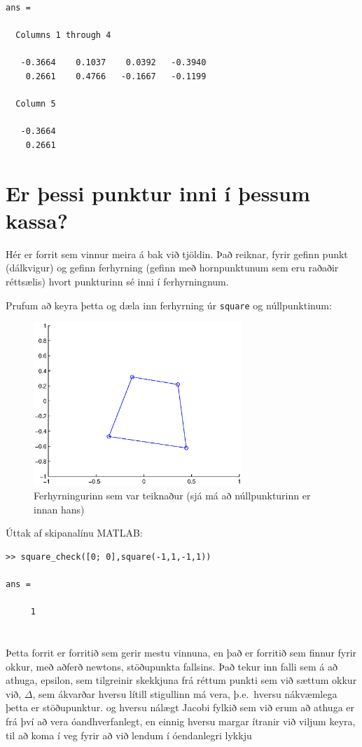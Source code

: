 \documentclass[a4]{article}
\begin{document}
\begin{flushright}
\begin{lstlisting}
ans =

  Columns 1 through 4

   -0.3664    0.1037    0.0392   -0.3940
    0.2661    0.4766   -0.1667   -0.1199

  Column 5

   -0.3664
    0.2661
\end{lstlisting}


\section{Er þessi punktur inni í þessum kassa?}

Hér er forrit sem vinnur meira á bak við tjöldin. Það reiknar, fyrir gefinn punkt (dálkvigur) og gefinn ferhyrning (gefinn með hornpunktunum sem eru raðaðir réttsælis) hvort punkturinn sé inni í ferhyrningnum.



Prufum að keyra þetta og dæla inn ferhyrning úr \lstinline{square} og núllpunktinum:

\begin{figure}[h!]
\centering
\includegraphics[width=0.7\textwidth]{sqchdaemi.eps}
\caption{Ferhyrningurinn sem var teiknaður (sjá má að núllpunkturinn er innan hans)}
\end{figure}
Úttak af skipanalínu MATLAB:
\begin{lstlisting}
>> square_check([0; 0],square(-1,1,-1,1))

ans =

     1
\end{lstlisting}
\section{}
Þetta forrit er forritið sem gerir mestu vinnuna, en það er forritið sem finnur fyrir okkur, með aðferð newtons, stöðupunkta fallsins. Það tekur inn falli sem á að athuga,
epsilon, sem tilgreinir skekkjuna frá réttum punkti sem við sættum okkur við,
$\Delta$, sem ákvarðar hversu lítill stigullinn má vera, þ.e.\ hversu nákvæmlega þetta er stöðupunktur.
og hversu nálægt Jacobi fylkið sem við erum að athuga er frá því að vera óandhverfanlegt,
en einnig hversu margar ítranir við viljum keyra, til að koma í veg fyrir að við lendum í óendanlegri lykkju


\end{flushright}
\end{document}
